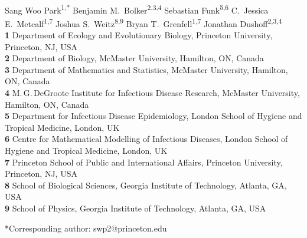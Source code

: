 \documentclass[12pt]{article}
\date{\today}
\providecommand{\DIFaddbegin}{} %
\providecommand{\DIFaddend}{} %
\providecommand{\DIFdelbegin}{} %
\providecommand{\DIFdelend}{} %
\newcommand{\DIFscaledelfig}{0.5}
\newlength{\DIFdelgraphicswidth} %
\newlength{\DIFdelgraphicsheight} %
\newcommand{\DIFaddincludegraphics}[2][]{{\color{blue}\fbox{\DIFOincludegraphics[#1]{#2}}}} %
\newcommand{\DIFdelincludegraphics}[2][]{%
\sbox{\DIFdelgraphicsbox}{\DIFOincludegraphics[#1]{#2}}%
\settoboxwidth{\DIFdelgraphicswidth}{\DIFdelgraphicsbox} %
\settoboxtotalheight{\DIFdelgraphicsheight}{\DIFdelgraphicsbox} %
\scalebox{\DIFscaledelfig}{%
\parbox[b]{\DIFdelgraphicswidth}{\usebox{\DIFdelgraphicsbox}\\[-\baselineskip] \rule{\DIFdelgraphicswidth}{0em}}\llap{\resizebox{\DIFdelgraphicswidth}{\DIFdelgraphicsheight}{%
\setlength{\unitlength}{\DIFdelgraphicswidth}%
\begin{picture}(1,1)%
\thicklines\linethickness{2pt} %
{\color[rgb]{1,0,0}\put(0,0){\framebox(1,1){}}}%
{\color[rgb]{1,0,0}\put(0,0){\line( 1,1){1}}}%
{\color[rgb]{1,0,0}\put(0,1){\line(1,-1){1}}}%
\end{picture}%
}\hspace*{3pt}}} %
} %
\DeclareRobustCommand{\DIFaddbegin}{\DIFOaddbegin \let\includegraphics\DIFaddincludegraphics} %
\DeclareRobustCommand{\DIFaddend}{\DIFOaddend \let\includegraphics\DIFOincludegraphics} %
\DeclareRobustCommand{\DIFdelbegin}{\DIFOdelbegin \let\includegraphics\DIFdelincludegraphics} %
\DeclareRobustCommand{\DIFdelend}{\DIFOaddend \let\includegraphics\DIFOincludegraphics} %
\begin{document}
\DIFdelbegin %
\DIFdelend \DIFaddbegin \begin{flushleft}{
	\Large
	\textbf{}
}
\DIFaddend \newline
\\
Sang Woo Park\textsuperscript{1,*}
Benjamin M.\ Bolker\textsuperscript{2,3,4}
Sebastian Funk\textsuperscript{5,6}
C.\ Jessica E.\ Metcalf\textsuperscript{1,7}
Joshua S.\ Weitz\textsuperscript{8,9}
Bryan T.\ Grenfell\textsuperscript{1,7}
Jonathan Dushoff\textsuperscript{2,3,4}
\\
\bigskip
\textbf{1} Department of Ecology and Evolutionary Biology, Princeton University, Princeton, NJ, USA
\\
\textbf{2} Department of Biology, McMaster University, Hamilton, ON, Canada
\\
\textbf{3} Department of Mathematics and Statistics, McMaster University, Hamilton, ON, Canada
\\
\textbf{4} M.\,G.\,DeGroote Institute for Infectious Disease Research, McMaster University, Hamilton, ON, Canada
\\
\textbf{5} Department for Infectious Disease Epidemiology, London School of Hygiene and Tropical Medicine, London, UK
\\
\textbf{6} Centre for Mathematical Modelling of Infectious Diseases, London School of Hygiene and Tropical Medicine, London, UK
\\
\textbf{7} Princeton School of Public and International Affairs, Princeton University, Princeton, NJ, USA
\\
\textbf{8} School of Biological Sciences, Georgia Institute of Technology, Atlanta, GA, USA
\\
\textbf{9} School of Physics, Georgia Institute of Technology, Atlanta, GA, USA
\\
\bigskip

*Corresponding author: swp2@princeton.edu
\bigskip

\end{flushleft}

\end{document}
